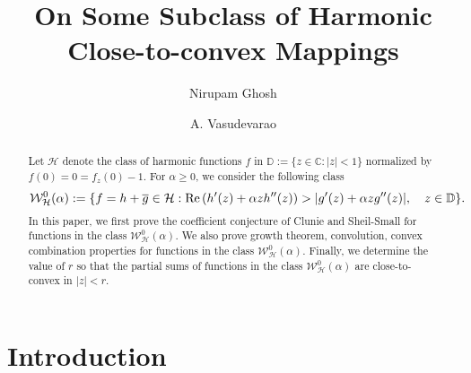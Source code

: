 \documentclass[a4paper,12pt]{amsart}
\theoremstyle{plain}
\theoremstyle{definition}
\newcounter{minutes}\setcounter{minutes}{\time}
\newcounter{hours}\setcounter{hours}{\time}
\begin{document}
\title{On Some Subclass of Harmonic Close-to-convex  Mappings}

\author{Nirupam Ghosh}
\address{Nirupam Ghosh,
Department of Mathematics,
Indian Institute of Technology Kharagpur,
Kharagpur-721 302, West Bengal, India.}

\author{A. Vasudevarao}
\address{A. Vasudevarao,
Department of Mathematics,
Indian Institute of Technology Kharagpur,
Kharagpur-721 302, West Bengal, India.}


 \makeatletter\makeatother

\begin{abstract}
Let $\mathcal{H}$ denote the class of harmonic functions $f$ in $\mathbb{D}:= \{z\in \mathbb{C}:|z| < 1\}$ normalized by $f(0) = 0 = f_z(0) -1$. For $\alpha \geq 0$, we consider  the following class
$$\mathcal{W}^0_{\mathcal{H}}(\alpha):= \{f = h + \overline{g}\in\mathcal{H}: {\rm Re\,}(h'(z) + \alpha z h''(z)) >|g'(z) + \alpha z g''(z)|, \quad z\in \mathbb{D}\}.
$$
In this paper, we first prove the coefficient conjecture of Clunie and Sheil-Small for functions in the class $\mathcal{W}^0_{\mathcal{H}}(\alpha)$.
We also prove  growth theorem, convolution, convex combination properties for functions in  the class $\mathcal{W}^0_{\mathcal{H}}(\alpha)$.
Finally, we  determine the value of $r$ so that the partial sums of  functions in the class $\mathcal{W}^0_{\mathcal{H}}(\alpha)$ are close-to-convex in $|z|<r$.
\end{abstract}

\maketitle
\pagestyle{myheadings}

\section{Introduction}
\end{document}

